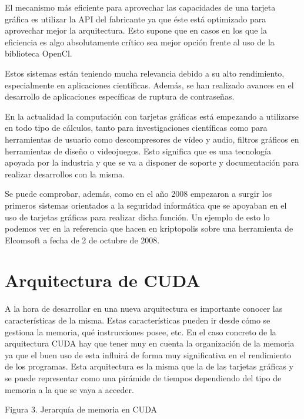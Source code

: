 El mecanismo más eficiente para aprovechar las capacidades de una tarjeta gráfica es utilizar la API del fabricante ya que éste está optimizado para aprovechar mejor la arquitectura. Esto supone que en casos en los que la eficiencia es algo absolutamente crítico sea mejor opción frente al uso de la biblioteca OpenCl.

Estos sistemas están teniendo mucha relevancia debido a su alto rendimiento, especialmente en aplicaciones científicas. Además, se han realizado avances en el desarrollo de aplicaciones específicas de ruptura de contraseñas.

En la actualidad la computación con tarjetas gráficas está empezando a utilizarse en todo tipo de cálculos, tanto para investigaciones científicas como para herramientas de usuario como descompresores de vídeo y audio, filtros gráficos en herramientas de diseño o videojuegos. Esto significa que es una tecnología apoyada por la industria y que se va a disponer de soporte y documentación para realizar desarrollos con la misma.

Se puede comprobar, además, como en el año 2008 empezaron a surgir los primeros sistemas orientados a la seguridad informática que se apoyaban en el uso de tarjetas gráficas para realizar dicha función. Un ejemplo de esto lo podemos ver en la referencia que hacen en kriptopolis sobre una herramienta de Elcomsoft a fecha de 2 de octubre de 2008.

\section{Arquitectura de CUDA}
A la hora de desarrollar en una nueva arquitectura es importante conocer las características de la misma. Estas características pueden ir desde cómo se gestiona la memoria, qué instrucciones posee, etc.
En el caso concreto de la arquitectura CUDA hay que tener muy en cuenta la organización de la memoria ya que el buen uso de esta influirá de forma muy significativa en el rendimiento de los programas. Esta arquitectura es la misma que la de las tarjetas gráficas y se puede representar como una pirámide de tiempos dependiendo del tipo de memoria a la que se vaya a acceder.
 
Figura 3. Jerarquía de memoria en CUDA

